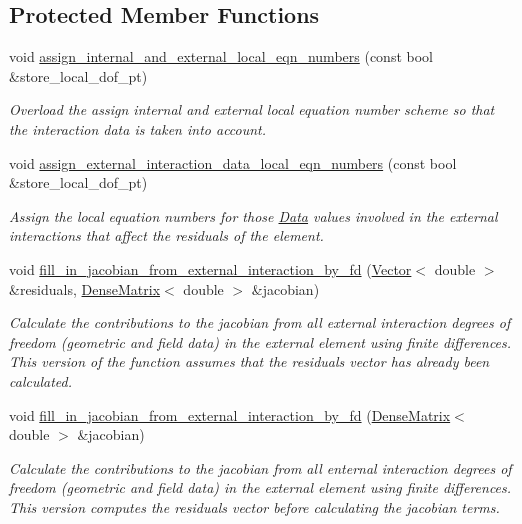 \subsection*{Protected Member Functions}
\begin{DoxyCompactItemize}
\item 
void \hyperlink{classoomph_1_1ElementWithExternalElement_ab8f4dda35ec3b01fe97701d7047b3a9d}{assign\+\_\+internal\+\_\+and\+\_\+external\+\_\+local\+\_\+eqn\+\_\+numbers} (const bool \&store\+\_\+local\+\_\+dof\+\_\+pt)
\begin{DoxyCompactList}\small\item\em Overload the assign internal and external local equation number scheme so that the interaction data is taken into account. \end{DoxyCompactList}\item 
void \hyperlink{classoomph_1_1ElementWithExternalElement_ade1035d03b79379a8d7b786217102214}{assign\+\_\+external\+\_\+interaction\+\_\+data\+\_\+local\+\_\+eqn\+\_\+numbers} (const bool \&store\+\_\+local\+\_\+dof\+\_\+pt)
\begin{DoxyCompactList}\small\item\em Assign the local equation numbers for those \hyperlink{classoomph_1_1Data}{Data} values involved in the external interactions that affect the residuals of the element. \end{DoxyCompactList}\item 
void \hyperlink{classoomph_1_1ElementWithExternalElement_a80731cecc55aee156fb92aa72a77e882}{fill\+\_\+in\+\_\+jacobian\+\_\+from\+\_\+external\+\_\+interaction\+\_\+by\+\_\+fd} (\hyperlink{classoomph_1_1Vector}{Vector}$<$ double $>$ \&residuals, \hyperlink{classoomph_1_1DenseMatrix}{Dense\+Matrix}$<$ double $>$ \&jacobian)
\begin{DoxyCompactList}\small\item\em Calculate the contributions to the jacobian from all external interaction degrees of freedom (geometric and field data) in the external element using finite differences. This version of the function assumes that the residuals vector has already been calculated. \end{DoxyCompactList}\item 
void \hyperlink{classoomph_1_1ElementWithExternalElement_a8a1610a620f55a8051c0426f937f11b5}{fill\+\_\+in\+\_\+jacobian\+\_\+from\+\_\+external\+\_\+interaction\+\_\+by\+\_\+fd} (\hyperlink{classoomph_1_1DenseMatrix}{Dense\+Matrix}$<$ double $>$ \&jacobian)
\begin{DoxyCompactList}\small\item\em Calculate the contributions to the jacobian from all enternal interaction degrees of freedom (geometric and field data) in the external element using finite differences. This version computes the residuals vector before calculating the jacobian terms. \end{DoxyCompactList}\item 

\end{DoxyCompactItemize}
